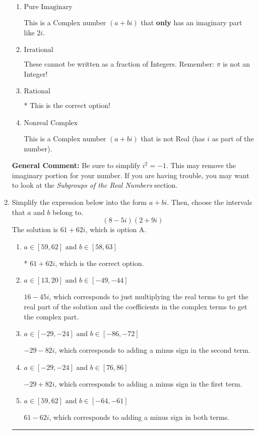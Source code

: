 \documentclass{extbook}[14pt]
\newcommand{\litem}[1]{\item #1

\rule{\textwidth}{0.4pt}}
\begin{document}
\begin{enumerate}
{\begin{enumerate}[label=\Alph*.]
This is not a number. The only non-Complex number we know is dividing by 0 as this is not a number!
\item \( \text{Pure Imaginary} \)

This is a Complex number $(a+bi)$ that \textbf{only} has an imaginary part like $2i$.
\item \( \text{Irrational} \)

These cannot be written as a fraction of Integers. Remember: $\pi$ is not an Integer!
\item \( \text{Rational} \)

* This is the correct option!
\item \( \text{Nonreal Complex} \)

This is a Complex number $(a+bi)$ that is not Real (has $i$ as part of the number).
\end{enumerate}

\textbf{General Comment:} Be sure to simplify $i^2 = -1$. This may remove the imaginary portion for your number. If you are having trouble, you may want to look at the \textit{Subgroups of the Real Numbers} section.
}
\litem{
Simplify the expression below into the form $a+bi$. Then, choose the intervals that $a$ and $b$ belong to.
\[ (8 - 5 i)(2 + 9 i) \]The solution is \( 61 + 62 i \), which is option A.\begin{enumerate}[label=\Alph*.]
\item \( a \in [59, 62] \text{ and } b \in [58, 63] \)

* $61 + 62 i$, which is the correct option.
\item \( a \in [13, 20] \text{ and } b \in [-49, -44] \)

 $16 - 45 i$, which corresponds to just multiplying the real terms to get the real part of the solution and the coefficients in the complex terms to get the complex part.
\item \( a \in [-29, -24] \text{ and } b \in [-86, -72] \)

 $-29 - 82 i$, which corresponds to adding a minus sign in the second term.
\item \( a \in [-29, -24] \text{ and } b \in [76, 86] \)

 $-29 + 82 i$, which corresponds to adding a minus sign in the first term.
\item \( a \in [59, 62] \text{ and } b \in [-64, -61] \)

 $61 - 62 i$, which corresponds to adding a minus sign in both terms.
\end{enumerate}

}
\end{enumerate}
\end{document}
